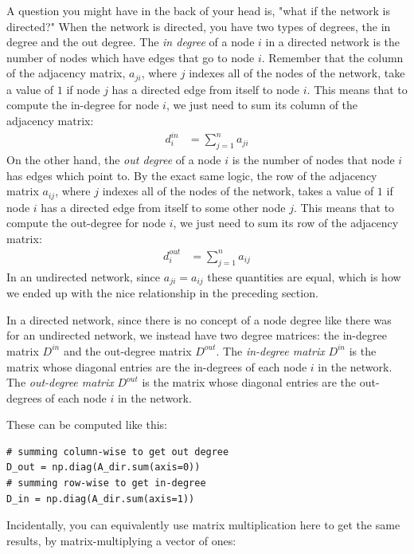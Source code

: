 A question you might have in the back of your head is, "what if the network is directed?" When the network is directed, you have two types of degrees, the {in degree} and the {out degree}. The \textit{in degree} of a node $i$ in a directed network is the number of nodes which have edges that go {to} node $i$. Remember that the column of the adjacency matrix, $a_{ji}$, where $j$ indexes all of the nodes of the network, take a value of $1$ if node $j$ has a directed edge from itself to node $i$. This means that to compute the in-degree for node $i$, we just need to sum its column of the adjacency matrix:
\begin{align*}
    d_i^{in} &= \sum_{j = 1}^n a_{ji}
\end{align*}
On the other hand, the \textit{out degree} of a node $i$ is the number of nodes that node $i$ has edges which point to. By the exact same logic, the row of the adjacency matrix $a_{ij}$, where $j$ indexes all of the nodes of the network, takes a value of $1$ if node $i$ has a directed edge from itself to some other node $j$. This means that to compute the out-degree for node $i$, we just need to sum its row of the adjacency matrix:
\begin{align*}
    d_i^{out} &= \sum_{j = 1}^n a_{ij}
\end{align*}
In an undirected network, since $a_{ji} = a_{ij}$ these quantities are equal, which is how we ended up with the nice relationship in the preceding section. 

In a directed network, since there is no concept of a {node degree} like there was for an undirected network, we instead have two degree matrices: the {in-degree matrix} $D^{in}$ and the {out-degree matrix} $D^{out}$. The \textit{in-degree matrix} $D^{in}$ is the matrix whose diagonal entries are the in-degrees of each node $i$ in the network. The \textit{out-degree matrix} $D^{out}$ is the matrix whose diagonal entries are the out-degrees of each node $i$ in the network. 

These can be computed like this:

\begin{lstlisting}[style=python]
# summing column-wise to get out degree
D_out = np.diag(A_dir.sum(axis=0))
# summing row-wise to get in-degree
D_in = np.diag(A_dir.sum(axis=1))
\end{lstlisting}

Incidentally, you can equivalently use matrix multiplication here to get the same results, by matrix-multiplying a vector of ones:

